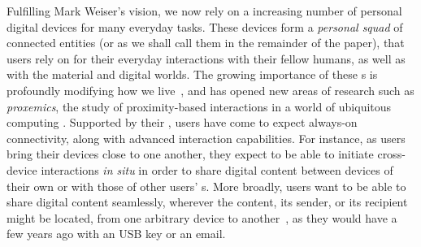 Fulfilling Mark Weiser's vision, we now rely on a increasing number of personal digital devices for many everyday tasks. These devices form a \textit{personal squad} of connected entities (or \emph{\squad} as we shall call them in the remainder of the
paper), that users rely on for their everyday interactions with their fellow humans, as well as with the material and digital worlds.
The growing importance of these \squad{}s is profoundly modifying how we live~\cite{Dearman:2008, Oh:2017, Sohn:2008,Harper08}, and has opened new areas of research such as \textit{proxemics}, the study of proximity-based interactions in a world of ubiquitous computing
\cite{Marquardt:2011}.
Supported by their \squad, users
have come to expect always-on connectivity, along with advanced interaction
capabilities. For instance, as users bring
their devices close to one another, they expect to be able to initiate cross-device
interactions \textit{in situ} in order to share digital content
\cite{Oh:2017} between devices of their own \squad or with those of other users' \squad{}s. More broadly, users want to be able to share digital content seamlessly,
wherever the content, its sender, or its recipient might be located, from one
arbitrary device to another~\cite{Dearman:2008}, as they
would have a few years ago with an USB key or an email. 

